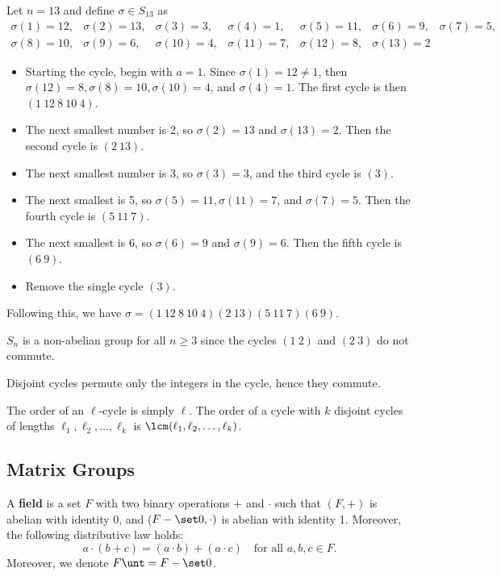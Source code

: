 \ex Let $n = 13$ and define $\sigma \in S_{13}$ as
    \[\begin{array}{ccccccc}
        \sigma(1) = 12, & \sigma(2) = 13, & \sigma(3) = 3, & \sigma(4) = 1, & \sigma(5) = 11, & \sigma(6) = 9, & \sigma(7) = 5, \\
        \sigma(8) = 10, & \sigma(9) = 6, & \sigma(10) = 4, & \sigma(11) = 7, & \sigma(12) = 8, & \sigma(13) = 2
    \end{array}\]
    \begin{itemize}
        \item Starting the cycle, begin with $a = 1$. Since $\sigma(1) = 12\neq 1$, then $\sigma(12) = 8, \sigma(8) = 10, \sigma(10) = 4$, and $\sigma(4) = 1$. The first cycle is then $(1\ 12\ 8\ 10\ 4)$.
        \item The next smallest number is 2, so $\sigma(2) = 13$ and $\sigma(13) = 2$. Then the second cycle is $(2\ 13)$.
        \item The next smallest number is 3, so $\sigma(3) = 3$, and the third cycle is $(3)$.
        \item The next smallest is 5, so $\sigma(5) = 11, \sigma(11) = 7$, and $\sigma(7) = 5$. Then the fourth cycle is $(5\ 11\ 7)$.
        \item The next smallest is 6, so $\sigma(6) = 9$ and $\sigma(9) = 6$. Then the fifth cycle is $(6\ 9)$.
        \item Remove the single cycle $(3)$.
    \end{itemize}
    Following this, we have $\sigma = (1\ 12\ 8\ 10\ 4)(2\ 13)(5\ 11\ 7)(6\ 9)$.

\note $S_n$ is a non-abelian group for all $n \geq 3$ since the cycles $(1\ 2)$ and $(2\ 3)$ do not commute.

\note Disjoint cycles permute only the integers in the cycle, hence they commute.

\note The order of an $\ell$-cycle is simply $\ell$. The order of a cycle with $k$ disjoint cycles of lengths $\ell_1, \ell_2, \ldots, \ell_k$ is $\lcm(\ell_1, \ell_2, \ldots, \ell_k)$.

\newpage

\subsection{Matrix Groups} \label{sec1.4}

 A \textbf{field} is a set $F$ with two binary operations $+$ and $\cdot$ such that $(F, +)$ is abelian with identity 0, and ($F - \set 0, \cdot)$ is abelian with identity 1. Moreover, the following distributive law holds:
\[a \cdot (b + c) = (a \cdot b) + (a \cdot c) \quad \text{for all } a, b, c \in F.\]
Moreover, we denote $F\unt = F - \set 0$.

